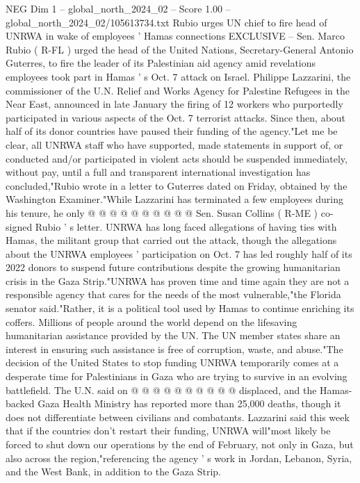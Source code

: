 \begin{textsample}{NEG Dim 1 – global\_north\_2024\_02 – Score 1.00 – global\_north\_2024\_02/105613734.txt}  \label{ex:f1_neg_184}
Rubio urges UN chief to fire head of UNRWA in wake of employees ' Hamas connections EXCLUSIVE -- Sen.
Marco Rubio ( R-FL ) urged the head of the United Nations, Secretary-General Antonio Guterres, to fire the leader of its Palestinian aid agency amid revelations employees took part in Hamas ' s Oct. 7 attack on Israel.
Philippe Lazzarini, the commissioner of the U.N.
Relief and Works Agency for Palestine Refugees in the Near East, announced in late January the firing of 12 workers who purportedly participated in various aspects of the Oct. 7 terrorist attacks.
Since then, about half of its donor countries have paused their funding of the agency."Let me be clear, all UNRWA staff who have supported, made statements in support of, or conducted and/or participated in violent acts should be suspended immediately, without pay, until a full and transparent international investigation has concluded,"Rubio wrote in a letter to Guterres dated on Friday, obtained by the Washington Examiner."While Lazzarini has terminated a few employees during his tenure, he only @ @ @ @ @ @ @ @ @ @ Sen.
Susan Collins ( R-ME ) co-signed Rubio ' s letter.
UNRWA has long faced allegations of having ties with Hamas, the militant group that carried out the attack, though the allegations about the UNRWA employees ' participation on Oct. 7 has led roughly half of its 2022 donors to suspend future contributions despite the growing humanitarian crisis in the Gaza Strip."UNRWA has proven time and time again they are not a responsible agency that cares for the needs of the most vulnerable,"the Florida senator said."Rather, it is a political tool used by Hamas to continue enriching its coffers.
Millions of people around the world depend on the lifesaving humanitarian assistance provided by the UN.
The UN member states share an interest in ensuring such assistance is free of corruption, waste, and abuse."The decision of the United States to stop funding UNRWA temporarily comes at a desperate time for Palestinians in Gaza who are trying to survive in an evolving battlefield.
The U.N. said on @ @ @ @ @ @ @ @ @ @ displaced, and the Hamas-backed Gaza Health Ministry has reported more than 25,000 deaths, though it does not differentiate between civilians and combatants.
Lazzarini said this week that if the countries don't restart their funding, UNRWA will"most likely be forced to shut down our operations by the end of February, not only in Gaza, but also across the region,"referencing the agency ' s work in Jordan, Lebanon, Syria, and the West Bank, in addition to the Gaza Strip.

\end{textsample}
